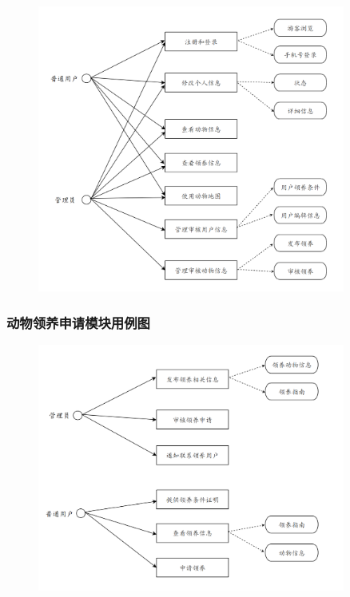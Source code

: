 \documentclass[12pt,a4paper,UTF8]{article}
\begin{document}
\begin{figure}[H]
  \centering
  \includegraphics[width=0.9\textwidth]{figures/case1.png}
\end{figure}

\subsubsection{动物领养申请模块用例图}

\begin{figure}[H]
  \centering
  \includegraphics[width=0.9\textwidth]{figures/case2.png}
\end{figure}
\end{document}
